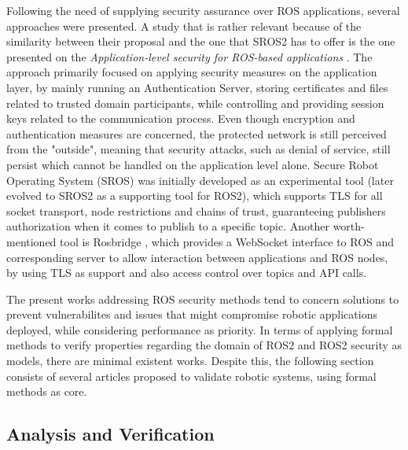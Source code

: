Following the need of supplying security assurance over ROS applications, several approaches were presented. A study that is rather relevant because of the similarity between their proposal and the one that SROS2 has to offer is the one presented on the \textit{Application-level security for ROS-based applications} \cite{application-security-ros}. The approach primarily focused on applying security measures on the application layer, by mainly running an Authentication Server, storing certificates and files related to trusted domain participants, while controlling and providing session keys related to the communication process. Even though encryption and authentication measures are concerned, the protected network is still perceived from the "outside", meaning that security attacks, such as denial of service, still persist which cannot be handled on the application level alone. Secure Robot Operating System (SROS) \cite{white2016sros} was initially developed as an experimental tool (later evolved to SROS2 as a supporting tool for ROS2), which supports TLS for all socket transport, node restrictions and chains of trust, guaranteeing publishers authorization when it comes to publish to a specific topic. Another worth-mentioned tool is Rosbridge \cite{crick2017rosbridge}, which provides a WebSocket interface to ROS and corresponding server to allow interaction between applications and ROS nodes, by using TLS as support and also access control over topics and API calls. 

The present works addressing ROS security methods tend to concern solutions to prevent vulnerabilites and issues that might compromise robotic applications deployed, while considering performance as priority. In terms of applying formal methods to verify properties regarding the domain of ROS2 and ROS2 security as models, there are minimal existent works. Despite this, the following section consists of several articles proposed to validate robotic systems, using formal methods as core.


\subsection{Analysis and Verification}\label{s:relWork-pv}


